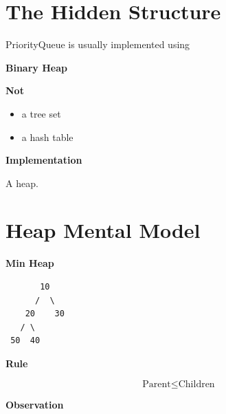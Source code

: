 \documentclass[11pt,a4paper]{book}
\begin{document}








\section{The Hidden Structure}

PriorityQueue is usually implemented using

\begin{center}
{\Large\textcolor{RosettaBlue}{\textbf{Binary Heap}}}
\end{center}

\medskip

\textcolor{RosettaRed}{\textbf{Not}}

\begin{itemize}[leftmargin=2em]
    \item a tree set
    \item a hash table
\end{itemize}

\medskip

\textcolor{RosettaDeepGreen}{\textbf{Implementation}}

A heap.
\section{Heap Mental Model}

\textcolor{RosettaBlue}{\textbf{Min Heap}}

\begin{center}
\begin{verbatim}
       10
      /  \
    20    30
   / \
 50  40
\end{verbatim}
\end{center}

\textcolor{RosettaRoyalPurple}{\textbf{Rule}}

\[
\boxed{\text{Parent} \le \text{Children}}
\]

\medskip

\textcolor{RosettaDeepGreen}{\textbf{Observation}}
\end{document}
